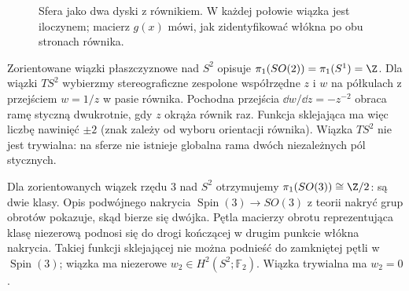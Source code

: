 \begin{figure}[htbp]
\centering
{}
\caption{Sfera jako dwa dyski z równikiem.
W każdej połowie wiązka jest iloczynem;
macierz $g(x)$ mówi, jak zidentyfikować
włókna po obu stronach równika.}
\label{fig:clutching-16}
\end{figure}

\begin{przyklad}
Zorientowane wiązki płaszczyznowe
nad $S^2$ opisuje
$\pi_1(SO(2))=\pi_1(S^1)=\Z$.
Dla wiązki $TS^2$ wybierzmy
stereograficzne zespolone
współrzędne $z$ i $w$
na półkulach z przejściem
$w=1/z$ w pasie równika.
Pochodna przejścia
$\dd w/\dd z=-z^{-2}$
obraca ramę styczną
dwukrotnie, gdy $z$
okrąża równik raz.
Funkcja sklejająca ma
więc liczbę nawinięć
$\pm2$ (znak zależy
od wyboru orientacji
równika). Wiązka $TS^2$
nie jest trywialna:
na sferze nie istnieje
globalna rama dwóch
niezależnych pól stycznych.
\end{przyklad}

\begin{przyklad}
Dla zorientowanych wiązek
rzędu $3$ nad $S^2$
otrzymujemy
$\pi_1(SO(3))\cong\Z/2$:
są dwie klasy.
Opis podwójnego nakrycia
$\operatorname{Spin}(3)\to SO(3)$
z teorii nakryć grup obrotów
pokazuje, skąd bierze się
dwójka. Pętla macierzy
obrotu reprezentująca
klasę niezerową podnosi
się do drogi kończącej
w drugim punkcie włókna
nakrycia. Takiej
funkcji sklejającej
nie można podnieść
do zamkniętej pętli
w $\operatorname{Spin}(3)$;
wiązka ma niezerowe
$w_2\in H^2(S^2;\mathbb F_2)$.
Wiązka trywialna ma
$w_2=0$.
\end{przyklad}

